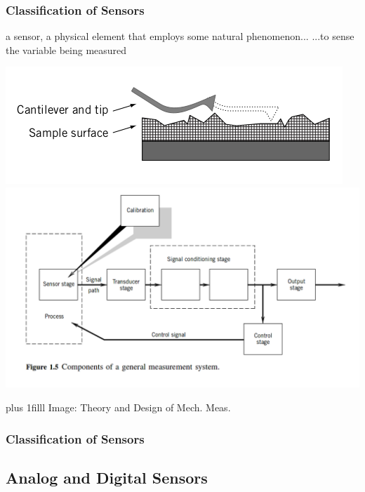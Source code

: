 \documentclass[fleqn]{beamer} %
\newcommand{\sectionIsubsectionItitle}{Classification of Sensors}
\newcommand{\sectionIsubsectionIItitle}{Analog and Digital Sensors}
\newcommand{\btVFill}{\vskip0pt plus 1filll}
\begin{document}
			\begin{frame}
				\frametitle{\sectionIsubsectionItitle}
				
				a {\PR sensor}, a physical element that employs some natural phenomenon... ...to sense the variable being measured
	
				\includegraphics[scale=0.30]{images/sensor_stage.png}\includegraphics[scale=0.20]{images/measurement_stages.png}

				\btVFill
				{\tiny Image: Theory and Design of Mech. Meas.}

			\end{frame}

			\begin{frame}
				\frametitle{\sectionIsubsectionItitle}

	

			\end{frame}

		\subsection{\sectionIsubsectionIItitle}\label{sectionIsubsectionII}
\end{document}
